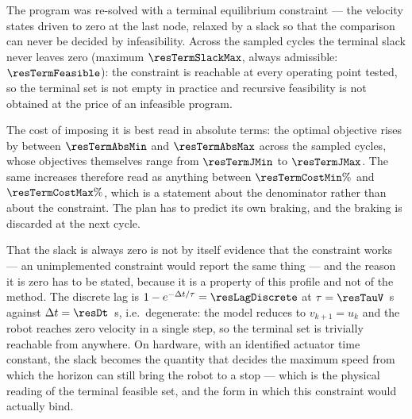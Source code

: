 \begin{table}[htbp]
  \centering
  \small
  \caption{Residual constraint violation against the penalty weight, for the non-smooth and the smooth relaxation of the same distance constraint. Bold: the violations that are exactly zero, which is the result the exact-penalty theorem predicts and the smooth relaxation never attains. Zero entries are below the solver tolerance of $1\times 10^{-8}$~m.}
  \label{res:tab:penalty}
\end{table}

\label{res:terminal}


The program was re-solved with a terminal equilibrium constraint --- the velocity states driven to zero at the last node, relaxed by a slack so that the comparison can never be decided by infeasibility. Across the sampled cycles the terminal slack never leaves zero (maximum $\resTermSlackMax$, always admissible: $\resTermFeasible$): the constraint is reachable at every operating point tested, so the terminal set is not empty in practice and recursive feasibility is not obtained at the price of an infeasible program.

The cost of imposing it is best read in absolute terms: the optimal objective rises by between $\resTermAbsMin$ and $\resTermAbsMax$ across the sampled cycles, whose objectives themselves range from $\resTermJMin$ to $\resTermJMax$. The same increases therefore read as anything between $\resTermCostMin\%$ and $\resTermCostMax\%$, which is a statement about the denominator rather than about the constraint. The plan has to predict its own braking, and the braking is discarded at the next cycle.

That the slack is always zero is not by itself evidence that the constraint works --- an unimplemented constraint would report the same thing --- and the reason it is zero has to be stated, because it is a property of this profile and not of the method. The discrete lag is $1-e^{-\Delta t/\tau}=\resLagDiscrete$ at $\tau=\resTauV$~s against $\Delta t=\resDt$~s, i.e.\ degenerate: the model reduces to $v_{k+1}=u_k$ and the robot reaches zero velocity in a single step, so the terminal set is trivially reachable from anywhere. On hardware, with an identified actuator time constant, the slack becomes the quantity that decides the maximum speed from which the horizon can still bring the robot to a stop --- which is the physical reading of the terminal feasible set, and the form in which this constraint would actually bind.

